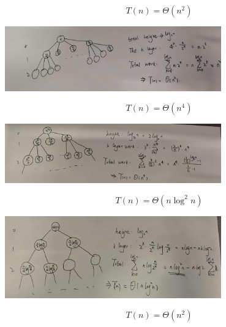 \documentclass[12pt,twoside]{article}
\begin{document}


\begin{problems}

\problem  %

\begin{problemparts}
\problempart %
\[T(n) = \Theta(n^2)\]
\begin{center}
  \includegraphics[width=0.7\textwidth]{tree1.jpg}
\end{center}
\problempart %
\[T(n) = \Theta(n^4)\]
\begin{center}
  \includegraphics[width=0.7\textwidth]{tree2.jpg}
\end{center}
\problempart %
\[T(n) = \Theta(n\log^2 n)\]
\begin{center}
  \includegraphics[width=0.7\textwidth]{tree3.jpg}
\end{center}
\problempart %
\[T(n) = \Theta(n^2)\]
\end{problemparts}

\newpage
\problem  %


\end{problems}
\end{document}
